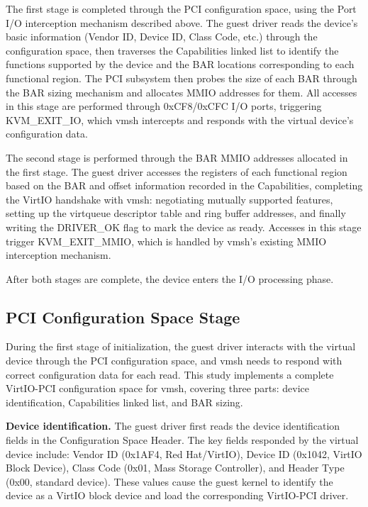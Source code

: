 \begin{ZhChapter}
The first stage is completed through the PCI configuration space, using the Port I/O interception mechanism described above. The guest driver reads the device's basic information (Vendor ID, Device ID, Class Code, etc.) through the configuration space, then traverses the Capabilities linked list to identify the functions supported by the device and the BAR locations corresponding to each functional region. The PCI subsystem then probes the size of each BAR through the BAR sizing mechanism and allocates MMIO addresses for them. All accesses in this stage are performed through 0xCF8/0xCFC I/O ports, triggering KVM\_EXIT\_IO, which vmsh intercepts and responds with the virtual device's configuration data.

The second stage is performed through the BAR MMIO addresses allocated in the first stage. The guest driver accesses the registers of each functional region based on the BAR and offset information recorded in the Capabilities, completing the VirtIO handshake with vmsh: negotiating mutually supported features, setting up the virtqueue descriptor table and ring buffer addresses, and finally writing the DRIVER\_OK flag to mark the device as ready. Accesses in this stage trigger KVM\_EXIT\_MMIO, which is handled by vmsh's existing MMIO interception mechanism.

After both stages are complete, the device enters the I/O processing phase.

\subsection{PCI Configuration Space Stage}
\label{sec:config-space-stage}

During the first stage of initialization, the guest driver interacts with the virtual device through the PCI configuration space, and vmsh needs to respond with correct configuration data for each read. This study implements a complete VirtIO-PCI configuration space for vmsh, covering three parts: device identification, Capabilities linked list, and BAR sizing.

\noindent\textbf{Device identification.} The guest driver first reads the device identification fields in the Configuration Space Header. The key fields responded by the virtual device include: Vendor ID (0x1AF4, Red Hat/VirtIO), Device ID (0x1042, VirtIO Block Device), Class Code (0x01, Mass Storage Controller), and Header Type (0x00, standard device). These values cause the guest kernel to identify the device as a VirtIO block device and load the corresponding VirtIO-PCI driver.


\end{ZhChapter}
